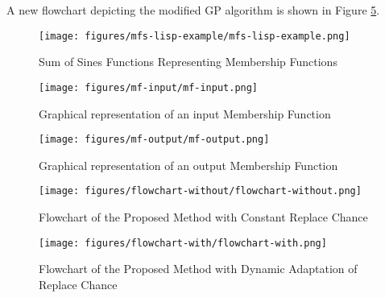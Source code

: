 \documentclass[12pt,journal,draftcls,onecolumn]{IEEEtran}
\begin{document}
A new flowchart depicting the modified GP algorithm is shown in Figure \ref{flowchart-with-dynamic}.


  
  
  
  
  
  
  
  
  
  
  
  
  
  
  
  
  
  
  
  
  
  
  

\begin{figure}[h!]
\caption{Sum of Sines Functions Representing Membership Functions}
\label{sum-of-sines-mfs}
\begin{center}
\texttt{[image: figures/mfs-lisp-example/mfs-lisp-example.png]}
\end{center}
\end{figure}

\begin{figure}[h!]
\caption{Graphical representation of an input Membership Function}
\label{input-mf}
\begin{center}
\texttt{[image: figures/mf-input/mf-input.png]}
\end{center}
\end{figure}

\begin{figure}[h!]
\caption{Graphical representation of an output Membership Function}
\label{output-mf}
\begin{center}
\texttt{[image: figures/mf-output/mf-output.png]}
\end{center}
\end{figure}

\begin{figure}[h!]
\caption{Flowchart of the Proposed Method with Constant Replace Chance}
\label{flowchart-without-dynamic}
\begin{center}
\texttt{[image: figures/flowchart-without/flowchart-without.png]}
\end{center}
\end{figure}

\begin{figure}[h!]
\caption{Flowchart of the Proposed Method with Dynamic Adaptation of
  Replace Chance}
\label{flowchart-with-dynamic}
\begin{center}
\texttt{[image: figures/flowchart-with/flowchart-with.png]}
\end{center}
\end{figure}
\end{document}
